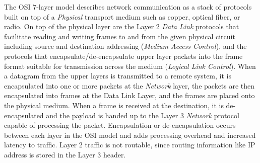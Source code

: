 
 



The OSI 7-layer model\cite{Zimmermann_1980} describes network communication as a stack of protocols built on top of a \textit{Physical} transport medium such as copper, optical fiber, or radio. On top of the physical layer are the Layer 2 \textit{Data Link} protocols that facilitate reading and writing frames to and from the given physical circuit including source and destination addressing (\textit{Medium Access Control}), and the protocols that encapsulate/de-encapsulate upper layer packets into the frame format suitable for transmission across the medium (\textit{Logical Link Control}). When a datagram from the upper layers is transmitted to a remote system, it is encapsulated into one or more packets at the \textit{Network} layer, the packets are then encapsulated into frames at the Data Link Layer, and the frames are placed onto the physical medium.  When a frame is received at the destination, it is de-encapsulated and the payload is handed up to the Layer 3 \textit{Network} protocol capable of processing the packet. Encapsulation or de-encapsulation occurs between each layer in the OSI model and  adds processing overhead and increased latency to traffic. Layer 2 traffic is not routable, since routing information like IP address is stored in the Layer 3 header. 


